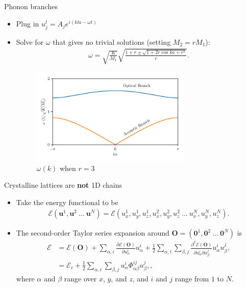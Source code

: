 \documentclass{beamer}
\newcommand*\vf[1]{\mathbf{#1}}
\begin{document}
\begin{frame}{Phonon branches}
\begin{itemize}
\item Plug in $u_j^l = A_j e^{i(kla - \omega t)}$
\item Solve for $\omega$ that gives no trivial solutions (setting $M_2 = r M_1$):
\begin{align}
\omega = \sqrt{\frac{K}{M_1}}
\sqrt{\frac{1 + r \pm \sqrt{1 + 2r\cos{ka} + r^2}}{r}}.
\end{align}
\begin{figure}
\includegraphics[width=3in]{figs/1d_dispersion.pdf}
\caption{\label{fig:1d_dispersion} $\omega(k)$ when $r = 3$}
\end{figure}
\end{itemize}
\end{frame}

\begin{frame}{Crystalline lattices are \textbf{not} 1D chains}
\begin{itemize}
\item Take the energy functional to be
\begin{align*}
\mathcal{E}(\vf{u}^1, \vf{u}^2~...~\vf{u}^N) = \mathcal{E}(u_x^1, u_y^1, u_z^1, u_x^2, u_y^2, u_z^2~...~u_x^N, u_y^N, u_z^N).
\end{align*}
\item The second-order Taylor series expansion around $\vf{O} = (\vf{0}^1, \vf{0}^2~...~\vf{0}^N)$ is
\begin{align}
\mathcal{E} &= \mathcal{E}(\vf{O}) + \sum_{\alpha,i} \frac{\partial \mathcal{E}(\vf{O})}{\partial u_\alpha^i}u_\alpha^i + \frac{1}{2} \sum_{\alpha,i} \sum_{\beta,j} \frac{\partial^2 \mathcal{E}(\vf{O})}{\partial u_\alpha^i \partial u_\beta^j} u_\alpha^i u_\beta^j, \\
&= \mathcal{E}_c + \frac{1}{2} \sum_{\alpha,i} \sum_{\beta,j} u_\alpha^i \Phi_{\alpha \beta}^{i j} u_\beta^{j}, \label{eq:3d_energy},
\end{align}
where $\alpha$ and $\beta$ range over $x$, $y$, and $z$, and $i$ and $j$ range from $1$ to $N$.
\end{itemize}
\end{frame}
\end{document}
